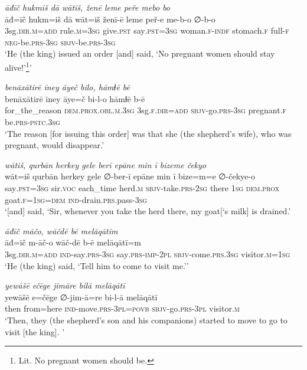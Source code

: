 \ea \label{KŠ.17}
\textit{āđīč hukmiš dā wātiš, ženē leme peře mebo bo} \\ 
\gll āđ=īč hukm=iš dā wāt=iš ženī-ē leme peř-e me-b-o ∅-b-o \\ 
 3sg\textsc{.dir}\textsc{.m}\textsc{=add} rule\textsc{.m}\textsc{=3sg} give\textsc{.pst} say\textsc{.pst}\textsc{=3sg} woman\textsc{.f}\textsc{-indf} stomach\textsc{.f} full\textsc{-f} \textsc{neg-}be\textsc{.prs}\textsc{-3sg} \textsc{sbjv-}be\textsc{.prs}\textsc{-3sg} \\ 
\glt `He (the king) issued an order [and] said, ‘No pregnant women should stay alive!’\footnote{Lit. No pregnant women should be.}'
\z 
 
\ea \label{KŠ.18}
\textit{benāxātirē īney āyeč bilo, hāmɫē bē} \\ 
\gll benāxātirē īney āye=č bi-l-o hāmɫē b-ē \\ 
 for\_the\_reason \textsc{dem.prox}\textsc{.obl}\textsc{.m}\textsc{.3sg} 3sg\textsc{.f}\textsc{.dir}\textsc{=add} \textsc{sbjv-}go\textsc{.prs}\textsc{-3sg} pregnant\textsc{.f} be\textsc{.prs}\textsc{-pstc}\textsc{.3sg} \\ 
\glt `The reason [for issuing this order] was that she (the shepherd’s wife), who was pregnant, would disappear.'
\z 
 
\ea \label{KŠ.28}
\textit{wātiš, qurbān herkey gele berī epāne min ī bizeme čekyo} \\ 
\gll wāt=iš qurbān herkey gele ∅-ber-ī epāne min ī bize=m=e ∅-čekye-o \\ 
 say\textsc{.pst}\textsc{=3sg} sir.\textsc{voc} each\_time herd\textsc{.m} \textsc{sbjv-}take\textsc{.prs}-\textsc{2sg} there \textsc{1sg} \textsc{dem.prox} goat\textsc{.f}\textsc{=\textsc{1sg}}\textsc{=dem} \textsc{ind-}drain\textsc{.prs}.pass\textsc{-3sg} \\ 
\glt `[and] said, ‘Sir, whenever you take the herd there, my goat[‘s milk] is drained.'
\z 
 
\ea \label{KŠ.52}
\textit{āđīč māčo, wāčdē bē melāqātīm} \\ 
\gll āđ=īč m-āč-o wāč-dē b-ē melāqātī=m \\ 
 3sg\textsc{.dir}\textsc{.m}\textsc{=add} \textsc{ind-}say\textsc{.prs}\textsc{-3sg} say\textsc{.prs}-\textsc{imp-}\textsc{2pl} \textsc{sbjv-}come\textsc{.prs}\textsc{.3sg} visitor\textsc{.m}\textsc{=\textsc{1sg}} \\ 
\glt `He (the king) said, ‘Tell him to come to visit me.’'
\z 
 
\ea \label{KŠ.53}
\textit{yewāšē ečēge jimāre bilā melāqātī} \\ 
\gll yewāšē e=čēge ∅-jim-ā=re bi-l-ā melāqātī \\ 
 then from=here \textsc{ind-}move\textsc{.prs}\textsc{-3pl}\textsc{=\textsc{povb}} \textsc{sbjv-}go\textsc{.prs}\textsc{-3pl} visitor\textsc{.m} \\ 
\glt `Then, they (the shepherd's son and his companions) started to move to go to visit [the king]. '
\z 
 
